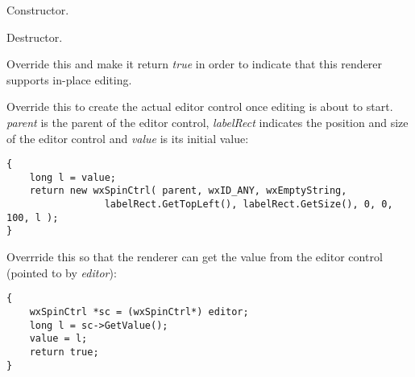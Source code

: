 
Constructor.

\label{wxdataviewcustomrendererdtor}


Destructor.


\label{wxdataviewcustomrendererhaseditorctrl}


Override this and make it return {\it true} in order to
indicate that this renderer supports in-place editing.

\label{wxdataviewcustomrenderercreateeditorctrl}


Override this to create the actual editor control once editing
is about to start. {\it parent} is the parent of the editor
control, {\it labelRect} indicates the position and
size of the editor control and {\it value} is its initial value:

{\small
\begin{verbatim}
{ 
    long l = value;
    return new wxSpinCtrl( parent, wxID_ANY, wxEmptyString, 
                 labelRect.GetTopLeft(), labelRect.GetSize(), 0, 0, 100, l );
}
\end{verbatim}
}

\label{wxdataviewcustomrenderergetvaluefromeditorctrl}


Overrride this so that the renderer can get the value 
from the editor control (pointed to by {\it editor}):

{\small
\begin{verbatim}
{ 
    wxSpinCtrl *sc = (wxSpinCtrl*) editor;
    long l = sc->GetValue();
    value = l;
    return true;
}
\end{verbatim}
}

